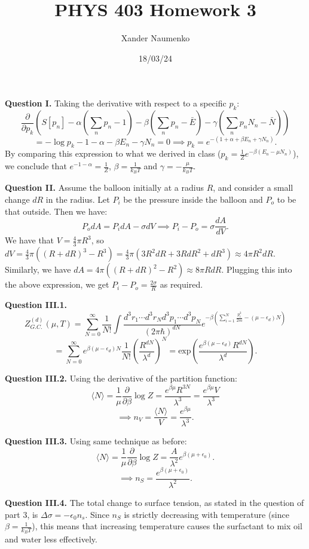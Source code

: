 \documentclass[letterpaper, reqno,11pt]{article}
\begin{document}
\title{PHYS 403 Homework 3}
\date{18/03/24}
\author{Xander Naumenko}
\maketitle

{\medskip\noindent\bf Question I.} Taking the derivative with respect to a specific $p_k$:
\[
    \frac{\partial}{\partial p_k} \left( S[p_n]-\alpha\left(\sum_{n}p_n-1\right)-\beta \left( \sum_n p_n-\bar E \right) -\gamma\left( \sum_n p_n N_n-\bar N \right) \right) 
\]
\[
=-\log p_k-1-\alpha-\beta E_n-\gamma N_n=0\implies p_k=e^{-(1+\alpha+\beta E_n+\gamma N_n)}
.\]
By comparing this expression to what we derived in class ($p_k= \frac{1}{Z}e^{-\beta(E_n-\mu N_n)}$), we conclude that $e^{-1-\alpha}=\frac{1}{Z}$, $\beta=\frac{1}{k_BT}$ and $\gamma=- \frac{\mu}{k_B T}$.

{\medskip\noindent\bf Question II.} Assume the balloon initially at a radius $R$, and consider a small change $dR$ in the radius. Let $P_i$ be the pressure inside the balloon and $P_o$ to be that outside. Then we have:
\[
P_odA=P_idA-\sigma dV\implies P_i-P_o= \sigma \frac{dA}{dV}
.\]
We have that $V=\frac{4}{3}\pi R^3$, so $dV=\frac{4}{3}\pi((R+dR)^3-R^3)=\frac{4}{3}\pi \left( 3R^2dR+3RdR^2+dR^3 \right)\approx 4\pi R^2dR$. Similarly, we have $dA=4\pi \left( (R+dR)^2-R^2 \right) \approx 8\pi RdR$. Plugging this into the above expression, we get $P_i-P_o= \frac{2\sigma}{R}$ as required.

{\medskip\noindent\bf Question III.1.}
\[
Z_{G.C.}^{(d)}(\mu, T)= \sum_{N=0}^{\infty} \frac{1}{N!}\int \frac{d^{3}r_1\cdots d^{3}r_Nd^{3}p_1\cdots d^{3}p_N}{(2\pi \hbar)^{dN}}e^{-\beta \left( \sum_{i=1}^{N} \frac{p_i^2}{2m}-(\mu-\epsilon_d) N \right) }
\]
\[
    =\sum_{N=0}^\infty e^{\beta(\mu-\epsilon_d) N}\frac{1}{N!} \left( \frac{R^{dN}}{\lambda^d} \right)^{N}=\text{exp}\left( \frac{e^{\beta(\mu-\epsilon_d)}R^{dN}}{\lambda^d} \right) 
.\]

{\medskip\noindent\bf Question III.2.} Using the derivative of the partition function:
\[
\langle N \rangle = \frac{1}{\mu} \frac{\partial}{\partial \beta}\log Z=\frac{e^{\beta\mu}R^{3N}}{\lambda^{3}}=\frac{e^{\beta\mu}V}{\lambda ^{3}}
\]
\[
\implies n_V= \frac{\langle N \rangle }{V}= \frac{e^{\beta\mu}}{\lambda^3}
.\]

{\medskip\noindent\bf Question III.3.} Using same technique as before:
\[
\langle N \rangle = \frac{1}{\mu} \frac{\partial}{\partial \beta}\log Z=\frac{A}{\lambda^2}e^{\beta\left( \mu+\epsilon_0 \right)}
.\]
\[
\implies n_S= \frac{e^{\beta(\mu+\epsilon_0)}}{\lambda^2}
.\]

{\medskip\noindent\bf Question III.4.} The total change to surface tension, as stated in the question of part 3, is $\Delta\sigma=-\epsilon_0 n_s$. Since $n_S$ is strictly decreasing with temperature (since $\beta=\frac{1}{k_B T}$), this means that increasing temperature causes the surfactant to mix oil and water less effectively.
\end{document}

